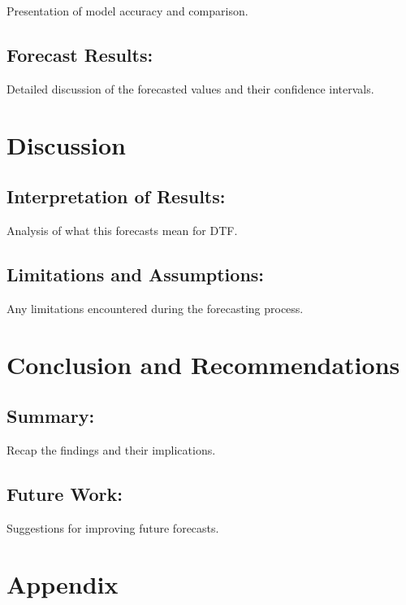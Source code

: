 \documentclass[11pt,a4paper,]{article}
\begin{document}
Presentation of model accuracy and comparison.

\subsection{Forecast Results:}\label{forecast-results}

Detailed discussion of the forecasted values and their confidence intervals.

\section{Discussion}\label{discussion}

\subsection{Interpretation of Results:}\label{interpretation-of-results}

Analysis of what this forecasts mean for DTF.

\subsection{Limitations and Assumptions:}\label{limitations-and-assumptions}

Any limitations encountered during the forecasting process.

\section{Conclusion and Recommendations}\label{conclusion-and-recommendations}

\subsection{Summary:}\label{summary}

Recap the findings and their implications.

\subsection{Future Work:}\label{future-work}

Suggestions for improving future forecasts.

\section{Appendix}\label{appendix}
\end{document}

